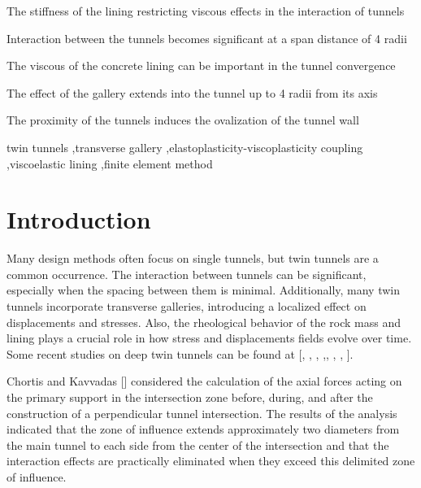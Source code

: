 \documentclass[a4paper,fleqn]{cas-sc}
\begin{document}
\begin{highlights}
	\item The stiffness of the lining restricting viscous effects in the interaction of tunnels
	\item Interaction between the tunnels becomes significant at a span distance of 4 radii
	\item The viscous of the concrete lining can be important in the tunnel convergence
	\item The effect of the gallery extends into the tunnel up to 4 radii from its axis
	\item The proximity of the tunnels induces the ovalization of the tunnel wall 
\end{highlights}

\begin{keywords}
twin tunnels \sep transverse gallery \sep elastoplasticity-viscoplasticity coupling
\sep viscoelastic lining \sep finite element method
\end{keywords}

\maketitle

\section{Introduction}\label{}

Many design methods often focus on single tunnels, but twin tunnels are a common occurrence. The interaction between tunnels can be significant, especially when the spacing between them is minimal. Additionally, many twin tunnels incorporate transverse galleries, introducing a localized effect on displacements and stresses. Also, the rheological behavior of the rock mass and lining plays a crucial role in how stress and displacements fields evolve over time. Some recent studies on deep twin tunnels can be found at [, , , ,, , , ].

Chortis and Kavvadas [] considered the calculation of the axial forces acting on the primary support in the intersection zone before, during, and after the construction of a perpendicular tunnel intersection. The results of the analysis indicated that the zone of influence extends approximately two diameters from the main tunnel to each side from the center of the intersection and that the interaction effects are practically eliminated when they exceed this delimited zone of influence. 
\end{document}
